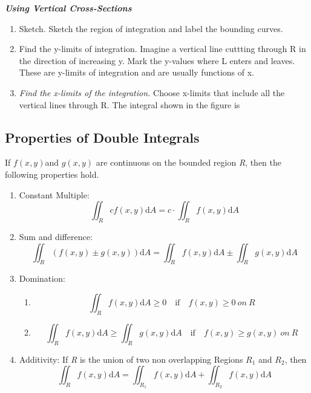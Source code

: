 \documentclass[12pt,a4paper,draft]{article}
\newenvironment{mynote}{\vspace{1\baselineskip}\begin{note}}{\end{note}\vspace{1\baselineskip}}
\newcommand{\fxy}{\(f(x,y)\)}
\begin{document}
\textit{\textbf{Using Vertical Cross-Sections}}
\begin{enumerate}
    \item Sketch. Sketch the region of integration and label the bounding curves.
    \item Find the y-limits of integration. Imagine a vertical line cuttting through R in the direction of increasing y. Mark the y-values where L enters and leaves. These are y-limits of integration and are usually functions of x.
    \item \textit{Find the x-limits of the integration.} Choose x-limits that include all the vertical lines through R. The integral shown in the figure is
    

\end{enumerate}




\subsection{Properties of Double Integrals}



\begin{mynote}

If \fxy and \(g(x,y)\) are continuous on the bounded region \textit{R}, then the following properties hold.

\begin{enumerate}
    \item Constant Multiple: \[\iint_R c f(x,y) \mathrm{d}A = c \cdot \iint_R  f(x,y) \mathrm{d}A\]
    \item Sum and difference: \[\iint_R (f(x,y) \pm g(x,y)) \mathrm{d}A = \iint_R f(x,y) \mathrm{d}A  \pm \iint_R g(x,y) \mathrm{d}A\]
    \item Domination: 
    \begin{enumerate}[label=\alph*)]
        \item \[\iint_R f(x,y) \mathrm{d}A \geq 0 \quad \mathrm{if} \quad f(x,y) \geq 0 \ on \  R\]
        \item \[\iint_R f(x,y) \mathrm{d}A \geq \iint_R g(x,y) \mathrm{d}A \quad \mathrm{if} \quad f(x,y) \geq g(x,y) \ on \ R\]
    \end{enumerate}
    \item Additivity: If \textit{R} is the union of two non overlapping Regions \(R_1\) and \(R_2\), then \[\iint_R f(x,y) \mathrm{d}A =\iint_{R_1} f(x,y) \mathrm{d}A + \iint_{R_2} f(x,y) \mathrm{d}A\]
\end{enumerate}


\end{mynote}
  
\end{document}
